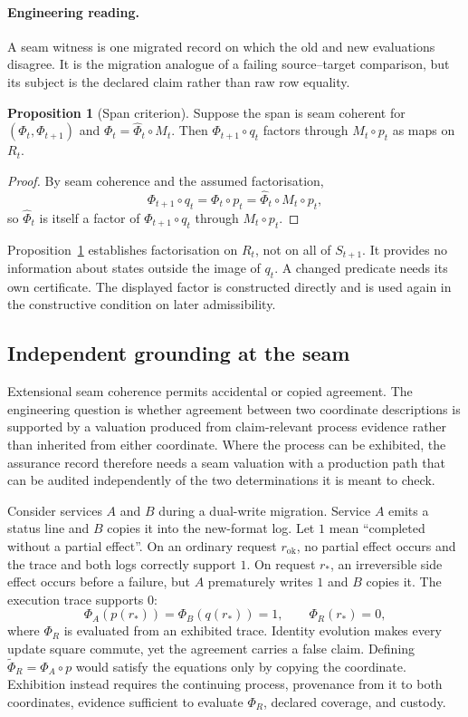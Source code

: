 \documentclass[11pt]{article}
\theoremstyle{definition}
\newtheorem{proposition}{Proposition}[section]
\begin{document}
\paragraph{Engineering reading.} A seam witness is one migrated record on which the old and new evaluations disagree. It is the migration analogue of a failing source--target comparison, but its subject is the declared claim rather than raw row equality.

\begin{proposition}[Span criterion]\label{ex:prop:span}
Suppose the span is seam coherent for $(\Phi_t,\Phi_{t+1})$ and $\Phi_t=\widehat\Phi_t \circ M_t$. Then $\Phi_{t+1} \circ q_t$ factors through $M_t \circ p_t$ as maps on $R_t$.
\end{proposition}

\begin{proof}
By seam coherence and the assumed factorisation,
\[
\Phi_{t+1}\circ q_t=\Phi_t\circ p_t=\widehat\Phi_t\circ M_t\circ p_t,
\]
so $\widehat\Phi_t$ is itself a factor of $\Phi_{t+1}\circ q_t$ through $M_t\circ p_t$.
\end{proof}

Proposition~\ref{ex:prop:span} establishes factorisation on $R_t$, not on all of $S_{t+1}$. It provides no information about states outside the image of $q_t$. A changed predicate needs its own certificate. The displayed factor is constructed directly and is used again in the constructive condition on later admissibility.

\subsection{Independent grounding at the seam}\label{ex:sec:grounding-seam}

Extensional seam coherence permits accidental or copied agreement. The engineering question is whether agreement between two coordinate descriptions is supported by a valuation produced from claim-relevant process evidence rather than inherited from either coordinate. Where the process can be exhibited, the assurance record therefore needs a seam valuation with a production path that can be audited independently of the two determinations it is meant to check.

Consider services $A$ and $B$ during a dual-write migration. Service $A$ emits a status line and $B$ copies it into the new-format log. Let $1$ mean ``completed without a partial effect''. On an ordinary request $r_{\mathrm{ok}}$, no partial effect occurs and the trace and both logs correctly support $1$. On request $r_*$, an irreversible side effect occurs before a failure, but $A$ prematurely writes $1$ and $B$ copies it. The execution trace supports $0$:
\[
\Phi_A(p(r_*))
=\Phi_B(q(r_*))=1,
\qquad
\Phi_R(r_*)=0,
\]
where $\Phi_R$ is evaluated from an exhibited trace. Identity evolution makes every update square commute, yet the agreement carries a false claim. Defining $\widetilde\Phi_R=\Phi_A\circ p$ would satisfy the equations only by copying the coordinate. Exhibition instead requires the continuing process, provenance from it to both coordinates, evidence sufficient to evaluate $\Phi_R$, declared coverage, and custody.
\end{document}
